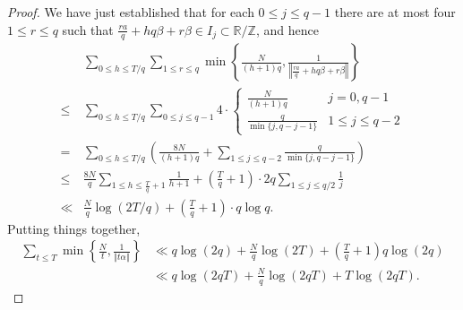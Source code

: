 \documentclass{article}
\newcommand{\norm}[1]{\left\Vert #1 \right\Vert}
\theoremstyle{definition}
\begin{document}
\begin{proof}
We have just established that for each $0 \leq j \leq q-1$ there are at most
four $1 \leq r \leq q$ such that $\frac{ra}{q}+hq\beta+r\beta \in I_j \subset \mathbb{R} / \mathbb{Z}$, and
hence
\[
\begin{split}
&\sum_{0 \leq h \leq T/q} \sum_{1 \leq r \leq q} \min\left\{\frac{N}{(h+1)q},\frac{1}{\norm{\frac{ra}{q}+hq\beta+r\beta}}\right\}\\
\leq&\sum_{0 \leq h \leq T/q} \sum_{0 \leq j \leq q-1} 4 \cdot \begin{cases}
\frac{N}{(h+1)q}&j=0,q-1\\
\frac{q}{\min\{j,q-j-1\}}&1 \leq j \leq q-2
\end{cases}\\
=&\sum_{0 \leq h \leq T/q} \left(\frac{8N}{(h+1)q} + \sum_{1 \leq j \leq q-2} \frac{q}{\min\{j,q-j-1\}} \right)\\
\leq&\frac{8N}{q}  \sum_{1 \leq h \leq \frac{T}{q}+1} \frac{1}{h+1} + \left( \frac{T}{q}+1\right) \cdot 2q
 \sum_{1 \leq j \leq q/2} \frac{1}{j}\\
 \ll&\frac{N}{q} \log(2T/q) + \left( \frac{T}{q}+1 \right) \cdot q \log q. 
\end{split}
\]
Putting things together,
\begin{align*}
\sum_{t \leq T} \min\left\{ \frac{N}{t}, \frac{1}{\norm{t\alpha}} \right\} & \ll q \log(2q)  + \frac{N}{q} \log(2T)
+\left(\frac{T}{q}+1\right) q \log(2q)\\
&\ll q \log(2qT) + \frac{N}{q} \log(2qT) + T \log(2qT).
\end{align*}
\end{proof}
\end{document}
